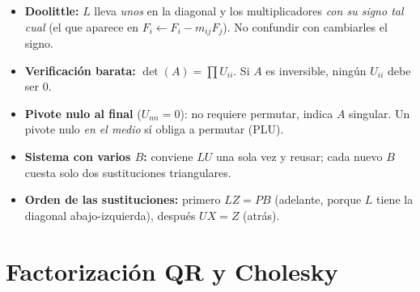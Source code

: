 \begin{truco}
\begin{itemize}
\item \textbf{Doolittle:} $L$ lleva \emph{unos} en la diagonal y los multiplicadores \emph{con su signo tal cual} (el que aparece en $F_i \leftarrow F_i - m_{ij}F_j$). No confundir con cambiarles el signo.
\item \textbf{Verificación barata:} $\det(A) = \prod U_{ii}$. Si $A$ es inversible, ningún $U_{ii}$ debe ser $0$.
\item \textbf{Pivote nulo al final} ($U_{nn}=0$): no requiere permutar, indica $A$ singular. Un pivote nulo \emph{en el medio} sí obliga a permutar (PLU).
\item \textbf{Sistema con varios $B$:} conviene $LU$ una sola vez y reusar; cada nuevo $B$ cuesta solo dos sustituciones triangulares.
\item \textbf{Orden de las sustituciones:} primero $LZ=PB$ (adelante, porque $L$ tiene la diagonal abajo-izquierda), después $UX=Z$ (atrás).
\end{itemize}
\end{truco}


\section{Factorización QR y Cholesky}

